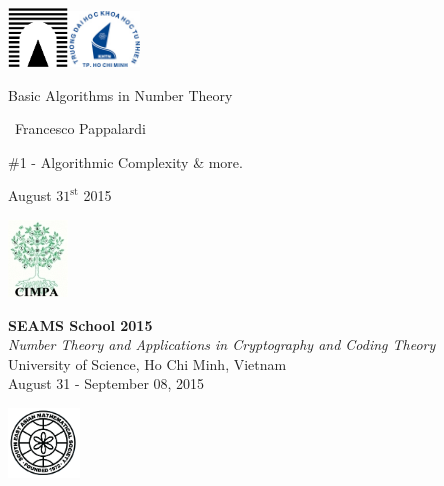 \documentclass[landscape]{powersem} %
\begin{document}

\begin{slide}
\includegraphics[width=1.6cm]{images/roma3.pdf}\hfill\includegraphics[width=1.9cm]{images/HCMCUS.jpeg}
\vfill

\begin{center}\begin{sc}
\begin{Large}

\textcolor{underlcolor}{Basic Algorithms in Number Theory}
\end{Large}\bigskip

\ {Francesco Pappalardi}\bigskip\bigskip

\begin{large}\begin{bf}\#1 - Algorithmic Complexity \& more.
\end{bf}\end{large}\medskip

August $31^{\textrm{st}}$ 2015\medskip
\vfill
\end{sc}\end{center}
\begin{scriptsize}
 \includegraphics[width=1.6cm]{images/cimpalogo.pdf}\hfill
\begin{minipage}[b]{7cm}
\textbf{SEAMS School 2015}\\
\textit{Number Theory and Applications in Cryptography and Coding Theory}\\
University of Science, Ho Chi Minh, Vietnam\\
August 31 - September 08, 2015
\end{minipage}\hfill
\includegraphics[width=1.9cm]{images/seams.png}
\end{scriptsize}


\end{slide}
\end{document}
